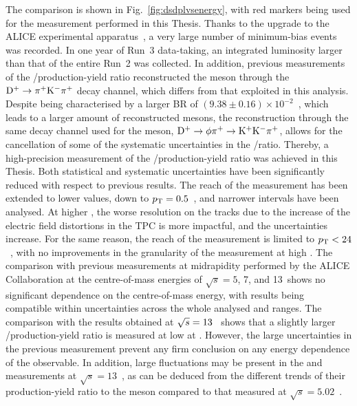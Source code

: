 The comparison is shown in Fig.~\ref{fig:dsdplvsenergy}, with red markers being used for the measurement performed in this Thesis. Thanks to the upgrade to the ALICE experimental apparatus~\cite{ALICE:2023udb}, a very large number of minimum-bias events was recorded. In one year of Run~3 data-taking, an integrated luminosity larger than that of the entire Run~2 was collected. In addition, previous measurements of the \ds/\dpl production-yield ratio reconstructed the \dpl meson through the $\mathrm{D^+}\rightarrow\pi^+\mathrm{K}^-\pi^+$ decay channel, which differs from that exploited in this analysis. Despite being characterised by a larger BR of \mbox{$(9.38\pm0.16)\times10^{-2}$}~\cite{pdg}, which leads to a larger amount of reconstructed \dpl mesons, the reconstruction through the same decay channel used for the \ds meson, $\mathrm{D^+} \rightarrow \mathrm{\phi\pi^+ \rightarrow K^+K^-\pi^+}$, allows for the cancellation of some of the systematic uncertainties in the \ds/\dpl ratio. Thereby, a high-precision measurement of the \ds/\dpl production-yield ratio was achieved in this Thesis. Both statistical and systematic uncertainties have been significantly reduced with respect to previous results. The \pt reach of the measurement has been extended to lower values, down to $p_\mathrm{T}=0.5$~\gevc, and narrower \pt intervals have been analysed. At higher \pt, the worse \pt resolution on the tracks due to the increase of the electric field distortions in the TPC is more impactful, and the uncertainties increase. For the same reason, the \pt reach of the measurement is limited to $p_\mathrm{T}<24$~\gevc, with no improvements in the granularity of the measurement at high \pt. The comparison with previous measurements at midrapidity performed by the ALICE Collaboration at the centre-of-mass energies of $\sqrt{s} = 5$, 7, and 13~\tev shows no significant dependence on the centre-of-mass energy, with results being compatible within uncertainties across the whole analysed \pt and \sqs ranges. The comparison with the results obtained at \mbox{$\sqrt{s}=13$~\tev} shows that a slightly larger \ds/\dpl production-yield ratio is measured at low \pt at \mbox{\thirteen}. However, the large uncertainties in the previous measurement prevent any firm conclusion on any energy dependence of the observable. In addition, large fluctuations may be present in the \ds and \dpl measurements at $\sqrt{s} = 13$~\tev, as can be deduced from the different trends of their production-yield ratio to the \dz meson compared to that measured at $\sqrt{s} = 5.02$~\tev. 

